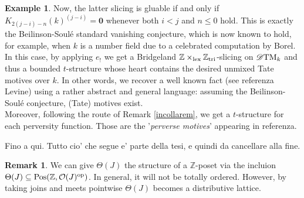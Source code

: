 \documentclass{article}
\theoremstyle{definition}
\newtheorem{exmp}[thm]{Example}
\newtheorem{rem}[thm]{Remark}
\newcommand{\Z}{\mathbb{Z}}
\newcommand{\Oo}{\mathcal{O}}
\newcommand{\per}{\Theta}
\newcommand{\pos}{\textnormal{Pos}}
\newcommand{\op}{\textnormal{op}}
\newcommand{\lex}{\times_{\textnormal{lex}}}
\newcommand{\triv}{\mathbb{Z}_{\textnormal{tri}}}
\begin{document}
\begin{exmp}
   Now, the latter slicing is gluable if and only if  $K_{2(j-i)-n}(k)^{(j-i)} = \mathbf{0}$  whenever both $i < j$ and $n \leq 0$ hold. This is exactly the Beilinson-Soul\'e standard vanishing conjecture, which is now known to hold, for example, when $k$ is a number field due to a celebrated computation by Borel. In this case, by applying $e_!$ we get a Bridgeland $\Z \lex \triv$-slicing on $\mathscr{D}\textnormal{TM}_k$ and thus a bounded $t$-structure whose heart contains the desired unmixed Tate motives over $k$. In other words, we recover a well known fact (see {\color{red} referenza Levine}) using a rather abstract and general language: assuming the Beilinson-Soul\'e conjecture, (Tate) motives exist. \\
   Moreover, following the route of Remark \ref{incollarem}, we get a $t$-structure for each perversity function. Those are the '\textit{perverse motives}' appearing in {\color{red} referenza}. 
\end{exmp} 


{\Huge Fino a qui. Tutto cio' che segue e' parte della tesi, e quindi da cancellare alla fine.} 


\begin{rem}
We can give $\per(J)$ the structure of a $\Z$-poset via the incluion $\per(J) \subseteq \pos(\Z,\Oo(J)^\op)$. In general, it will not be totally ordered. However, by taking joins and meets pointwise $\per(J)$ becomes a distributive lattice. 
\end{rem}
\end{document}

